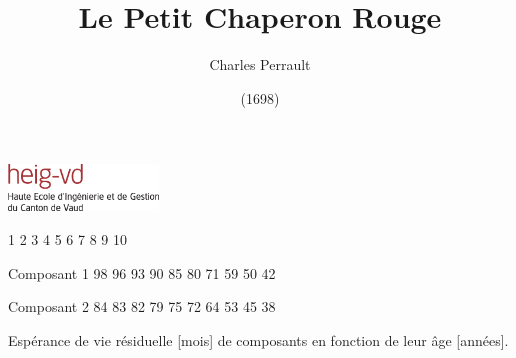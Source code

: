 \documentclass[a4paper,11pt]{article}
\title{Le Petit Chaperon Rouge}
\author{Charles Perrault}
\date{(1698)}
\begin{document}
\maketitle

\includegraphics[width=4cm,angle=0]{logo-HEIG-VD.eps}

              1   2   3   4   5   6   7   8   9  10
						
Composant 1  98  96  93  90  85  80  71  59  50  42

Composant 2  84  83  82  79  75  72  64  53  45  38

Espérance de vie résiduelle [mois] de composants en fonction de leur âge [années].
\end{document}
